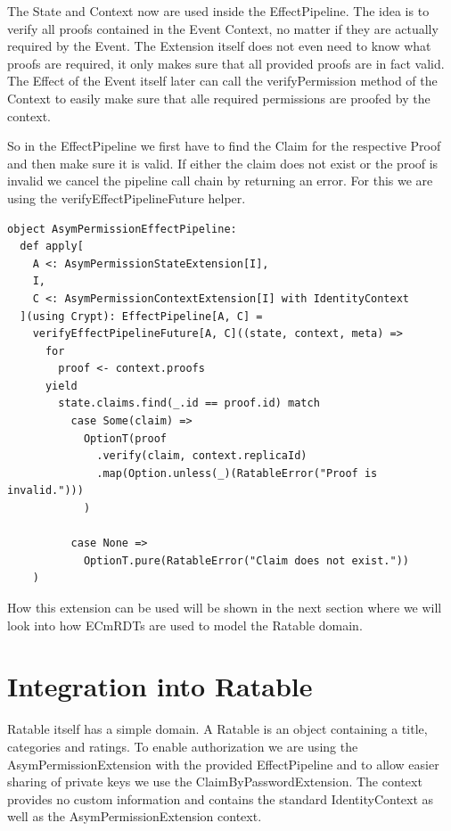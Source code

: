 \documentclass[
	ngerman,
	ruledheaders=section,   %
	class=report,		    %
	thesis={type=bachelor}, %
	accentcolor=9c,			%
	custommargins=true,    %
	marginpar=false,        %
	parskip=half-,          %
	fontsize=11pt,          %
]{tudapub}
\begin{document}
The State and Context now are used inside the EffectPipeline. The idea is to verify all proofs contained in the Event Context, no matter if they are actually required by the Event. The Extension itself does not even need to know what proofs are required, it only makes sure that all provided proofs are in fact valid. The Effect of the Event itself later can call the verifyPermission method of the Context to easily make sure that alle required permissions are proofed by the context.

So in the EffectPipeline we first have to find the Claim for the respective Proof and then make sure it is valid. If either the claim does not exist or the proof is invalid we cancel the pipeline call chain by returning an error. For this we are using the verifyEffectPipelineFuture helper.

\begin{lstlisting}
object AsymPermissionEffectPipeline:
  def apply[
    A <: AsymPermissionStateExtension[I], 
    I, 
    C <: AsymPermissionContextExtension[I] with IdentityContext
  ](using Crypt): EffectPipeline[A, C] =
    verifyEffectPipelineFuture[A, C]((state, context, meta) =>
      for
        proof <- context.proofs
      yield
        state.claims.find(_.id == proof.id) match
          case Some(claim) => 
            OptionT(proof
              .verify(claim, context.replicaId)
              .map(Option.unless(_)(RatableError("Proof is invalid.")))
            )

          case None => 
            OptionT.pure(RatableError("Claim does not exist."))
    )
\end{lstlisting}

How this extension can be used will be shown in the next section where we will look into how ECmRDTs are used to model the Ratable domain.

\section{Integration into Ratable}
Ratable itself has a simple domain. A Ratable is an object containing a title, categories and ratings. To enable authorization we are using the AsymPermissionExtension with the provided EffectPipeline and to allow easier sharing of private keys we use the ClaimByPasswordExtension. The context provides no custom information and contains the standard IdentityContext as well as the AsymPermissionExtension context.
\end{document}
